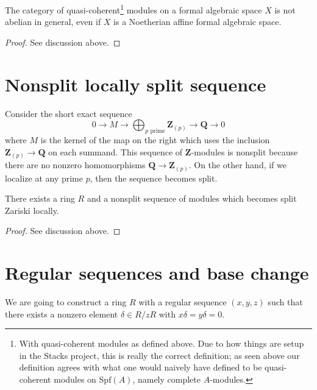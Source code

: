 \begin{lemma}
\label{lemma-quasi-coherent-not-abelian}
The category of quasi-coherent\footnote{With quasi-coherent modules
as defined above. Due to how things are setup in the Stacks project,
this is really the correct definition; as seen above our definition
agrees with what one would naively have defined to be quasi-coherent modules
on $\text{Spf}(A)$, namely complete $A$-modules.}
modules on a formal algebraic space
$X$ is not abelian in general, even if $X$ is a Noetherian affine
formal algebraic space.
\end{lemma}

\begin{proof}
See discussion above.
\end{proof}





\section{Nonsplit locally split sequence}
\label{section-nonsplit-locally-split}

\noindent
Consider the short exact sequence
$$
0 \to M \to
\bigoplus\nolimits_{p\text{ prime}} \mathbf{Z}_{(p)} \to \mathbf{Q} \to 0
$$
where $M$ is the kernel of the map on the right which uses the inclusion
$\mathbf{Z}_{(p)} \to \mathbf{Q}$ on each summand. This sequence of
$\mathbf{Z}$-modules is nonsplit because there are no nonzero
homomorphisms $\mathbf{Q} \to \mathbf{Z}_{(p)}$. On the other hand, if
we localize at any prime $p$, then the sequence becomes split.

\begin{lemma}
\label{lemma-nonsplit-locally-split}
There exists a ring $R$ and a nonsplit sequence of modules
which becomes split Zariski locally.
\end{lemma}

\begin{proof}
See discussion above.
\end{proof}





\section{Regular sequences and base change}
\label{section-regular-base-change}

\noindent
We are going to construct a ring $R$ with a regular sequence
$(x, y, z)$ such that there exists a nonzero element $\delta \in R/zR$
with $x\delta = y\delta = 0$.

